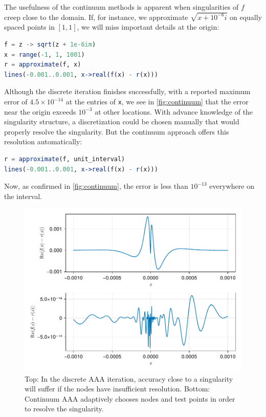 \documentclass{juliacon}
\begin{document}
The usefulness of the continuum methods is apparent when singularities of $f$ creep close to the domain. If, for instance, we approximate $\sqrt{x + 10^{-6}i}$ on equally spaced points in $[1,1]$, we will miss important details at the origin:
\begin{lstlisting}[language = Julia, caption={Discrete AAA for $\sqrt{x + 10^{-6}i}$.}]
f = z -> sqrt(z + 1e-6im)
x = range(-1, 1, 1001)
r = approximate(f, x)
lines(-0.001..0.001, x->real(f(x) - r(x)))
\end{lstlisting}
Although the discrete iteration finishes successfully, with a reported maximum error of $4.5\times 10^{-14}$ at the entries of \verb|x|, we see in \autoref{fig:continuum} that the error near the origin exceeds $10^{-3}$ at other locations. With advance knowledge of the singularity structure, a discretization could be chosen manually that would properly resolve the singularity. But the continuum approach offers this resolution automatically:
\begin{lstlisting}[language = Julia, caption={Continuum AAA for $\sqrt{x + 10^{-6}i}$.}]
r = approximate(f, unit_interval)
lines(-0.001..0.001, x->real(f(x) - r(x)))
\end{lstlisting}
Now, as confirmed in \autoref{fig:continuum}, the error is less than $10^{-13}$ everywhere on the interval. 

\begin{figure}
\centering
\includegraphics[width=\columnwidth]{continuum.pdf}
\caption{Top: In the discrete AAA iteration, accuracy close to a singularity will suffer if the nodes have insufficient resolution. Bottom: Continuum AAA adaptively chooses nodes and test points in order to resolve the singularity.}
\label{fig:continuum}
\end{figure}
\end{document}
